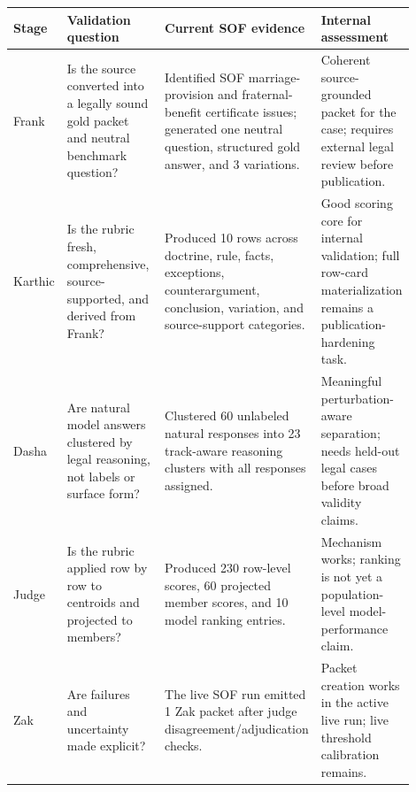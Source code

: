 \begin{tabular}{p{0.13\linewidth}p{0.25\linewidth}p{0.32\linewidth}p{0.20\linewidth}}
\toprule
Stage & Validation question & Current SOF evidence & Internal assessment \\
\midrule
Frank & Is the source converted into a legally sound gold packet and neutral benchmark question? & Identified SOF marriage-provision and fraternal-benefit certificate issues; generated one neutral question, structured gold answer, and 3 variations. & Coherent source-grounded packet for the case; requires external legal review before publication. \\
Karthic & Is the rubric fresh, comprehensive, source-supported, and derived from Frank? & Produced 10 rows across doctrine, rule, facts, exceptions, counterargument, conclusion, variation, and source-support categories. & Good scoring core for internal validation; full row-card materialization remains a publication-hardening task. \\
Dasha & Are natural model answers clustered by legal reasoning, not labels or surface form? & Clustered 60 unlabeled natural responses into 23 track-aware reasoning clusters with all responses assigned. & Meaningful perturbation-aware separation; needs held-out legal cases before broad validity claims. \\
Judge & Is the rubric applied row by row to centroids and projected to members? & Produced 230 row-level scores, 60 projected member scores, and 10 model ranking entries. & Mechanism works; ranking is not yet a population-level model-performance claim. \\
Zak & Are failures and uncertainty made explicit? & The live SOF run emitted 1 Zak packet after judge disagreement/adjudication checks. & Packet creation works in the active live run; live threshold calibration remains. \\
\bottomrule
\end{tabular}

